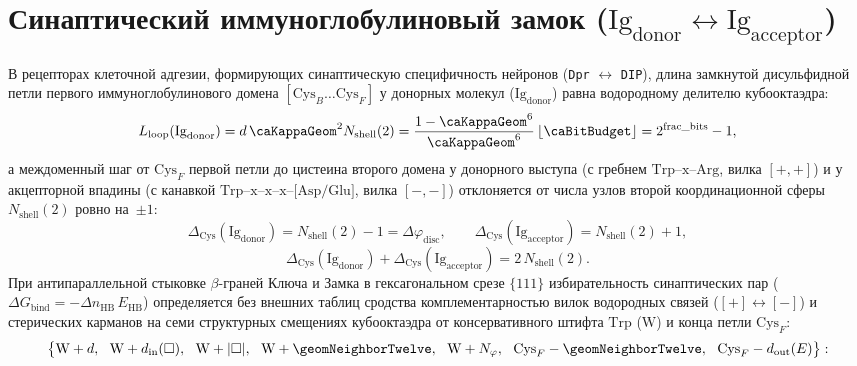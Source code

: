 \section{Синаптический иммуноглобулиновый замок (\texorpdfstring{$\text{Ig}_{\mathrm{donor}}\leftrightarrow\text{Ig}_{\mathrm{acceptor}}$}{Ig\_donor <-> Ig\_acceptor})}
\label{sec:bio-ig-synaptic-lock}

В рецепторах клеточной адгезии, формирующих синаптическую специфичность нейронов (\texttt{Dpr} $\leftrightarrow$ \texttt{DIP}), длина замкнутой дисульфидной петли первого иммуноглобулинового домена $[\text{Cys}_B\ldots\text{Cys}_F]$ у донорных молекул ($\text{Ig}_{\mathrm{donor}}$) равна водородному делителю кубооктаэдра:
\[
  L_{\mathrm{loop}}(\text{Ig}_{\mathrm{donor}})
  = d\,\caKappaGeom^2 N_{\mathrm{shell}}(2)
  = \frac{1-\caKappaGeom^6}{\caKappaGeom^6}\,\lfloor\caBitBudget\rfloor
  = 2^{\mathrm{frac\_bits}} - 1,
\]
а междоменный шаг от $\text{Cys}_F$ первой петли до цистеина второго домена у донорного выступа (с гребнем $\text{Trp--x--Arg}$, вилка $[+,+]$) и у акцепторной впадины (с канавкой $\text{Trp--x--x--x--[Asp/Glu]}$, вилка $[-,-]$) отклоняется от числа узлов второй координационной сферы $N_{\mathrm{shell}}(2)$ ровно на~$\pm 1$:
\[
  \Delta_{\mathrm{Cys}}(\text{Ig}_{\mathrm{donor}}) = N_{\mathrm{shell}}(2) - 1 = \Delta\varphi_{\mathrm{disc}},\qquad
  \Delta_{\mathrm{Cys}}(\text{Ig}_{\mathrm{acceptor}}) = N_{\mathrm{shell}}(2) + 1,
\]
\[
  \Delta_{\mathrm{Cys}}(\text{Ig}_{\mathrm{donor}}) + \Delta_{\mathrm{Cys}}(\text{Ig}_{\mathrm{acceptor}}) = 2\,N_{\mathrm{shell}}(2).
\]
При антипараллельной стыковке $\beta$-граней Ключа и Замка в гексагональном срезе $\{111\}$ избирательность синаптических пар ($\Delta G_{\mathrm{bind}} = -\Delta n_{\mathrm{HB}}\,E_{\mathrm{HB}}$) определяется без внешних таблиц сродства комплементарностью вилок водородных связей ($[+]\leftrightarrow [-]$) и стерических карманов на семи структурных смещениях кубооктаэдра от консервативного штифта $\text{Trp}$ ($\text{W}$) и конца петли $\text{Cys}_F$:
\[
  \bigl\{\text{W}+d,\ \ \text{W}+d_{\mathrm{in}}(\square),\ \ \text{W}+|\square|,\ \ \text{W}+\geomNeighborTwelve,\ \ \text{W}+N_\varphi,\ \ \text{Cys}_F-\geomNeighborTwelve,\ \ \text{Cys}_F-d_{\mathrm{out}}(E)\bigr\}:
\]

